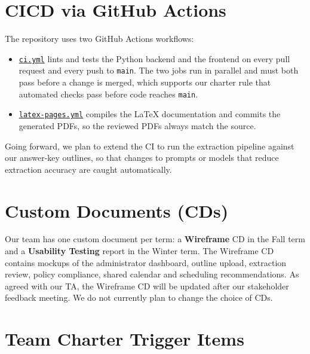 \documentclass{article}
\begin{document}
\section{CICD via GitHub Actions}

The repository uses two GitHub Actions workflows:

\begin{itemize}
  \item \href{https://github.com/shivyam/cas-course-optimization/blob/main/.github/workflows/ci.yml}{\texttt{ci.yml}}
  lints and tests the Python backend and the frontend on every pull request
  and every push to \texttt{main}. The two jobs run in parallel and must both
  pass before a change is merged, which supports our charter rule that
  automated checks pass before code reaches \texttt{main}.
  \item \href{https://github.com/shivyam/cas-course-optimization/blob/main/.github/workflows/latex-pages.yml}{\texttt{latex-pages.yml}}
  compiles the LaTeX documentation and commits the generated PDFs, so the
  reviewed PDFs always match the source.
\end{itemize}

\noindent Going forward, we plan to extend the CI to run the extraction pipeline
against our answer-key outlines, so that changes to prompts or models that
reduce extraction accuracy are caught automatically.

\section{Custom Documents (CDs)}


Our team has one custom document per term: a \textbf{Wireframe} CD in the Fall
term and a \textbf{Usability Testing} report in the Winter term. The Wireframe CD
contains mockups of the administrator dashboard, outline upload, extraction
review, policy compliance, shared calendar and scheduling recommendations. As
agreed with our TA, the Wireframe CD will be updated after our stakeholder
feedback meeting. We do not currently plan to change the choice of CDs.

\section{Team Charter Trigger Items}
\end{document}

